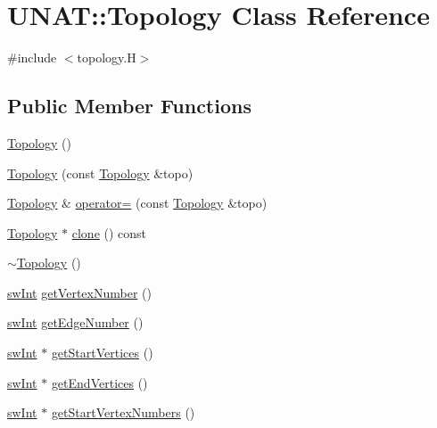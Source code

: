 \hypertarget{classUNAT_1_1Topology}{}\section{U\+N\+AT\+::Topology Class Reference}
\label{classUNAT_1_1Topology}


{\ttfamily \#include $<$topology.\+H$>$}

\subsection*{Public Member Functions}
\begin{DoxyCompactItemize}
\item 
\mbox{\hyperlink{classUNAT_1_1Topology_abca137a381a1bdd9c44afa3056f1d45b}{Topology}} ()
\item 
\mbox{\hyperlink{classUNAT_1_1Topology_ae1c53ba557ce7d0c587dd46d1eb2b018}{Topology}} (const \mbox{\hyperlink{classUNAT_1_1Topology}{Topology}} \&topo)
\item 
\mbox{\hyperlink{classUNAT_1_1Topology}{Topology}} \& \mbox{\hyperlink{classUNAT_1_1Topology_a3ffa6caa5e5543f555e6d1bc92e7992d}{operator=}} (const \mbox{\hyperlink{classUNAT_1_1Topology}{Topology}} \&topo)
\item 
\mbox{\hyperlink{classUNAT_1_1Topology}{Topology}} $\ast$ \mbox{\hyperlink{classUNAT_1_1Topology_acb0a82ccbd9db10c8e9ddfc73017587a}{clone}} () const
\item 
\mbox{\hyperlink{classUNAT_1_1Topology_a136b0445c89509d4d087a958b58e0d62}{$\sim$\+Topology}} ()
\item 
\mbox{\hyperlink{include_2swMacro_8h_a113cf5f6b5377cdf3fac6aa4e443e9aa}{sw\+Int}} \mbox{\hyperlink{classUNAT_1_1Topology_a7d1d4d508b6e0a44fb0b5f6e6f26a8a5}{get\+Vertex\+Number}} ()
\item 
\mbox{\hyperlink{include_2swMacro_8h_a113cf5f6b5377cdf3fac6aa4e443e9aa}{sw\+Int}} \mbox{\hyperlink{classUNAT_1_1Topology_ace06d8f272b20bdf46d3327f9e0fddf2}{get\+Edge\+Number}} ()
\item 
\mbox{\hyperlink{include_2swMacro_8h_a113cf5f6b5377cdf3fac6aa4e443e9aa}{sw\+Int}} $\ast$ \mbox{\hyperlink{classUNAT_1_1Topology_ade1737d852cde9f4d691b325dfd20c36}{get\+Start\+Vertices}} ()
\item 
\mbox{\hyperlink{include_2swMacro_8h_a113cf5f6b5377cdf3fac6aa4e443e9aa}{sw\+Int}} $\ast$ \mbox{\hyperlink{classUNAT_1_1Topology_ac43549991442cb8fa3494b523c9ec1a5}{get\+End\+Vertices}} ()
\item 
\mbox{\hyperlink{include_2swMacro_8h_a113cf5f6b5377cdf3fac6aa4e443e9aa}{sw\+Int}} $\ast$ \mbox{\hyperlink{classUNAT_1_1Topology_a331046e1e8c64d3e579ff940855e6908}{get\+Start\+Vertex\+Numbers}} ()

\end{DoxyCompactItemize}
